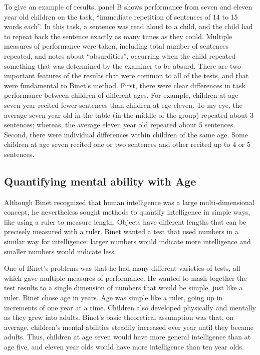 \documentclass[
  oneside,
  12pt]{crumpbook}
\begin{document}
To give an example of results, panel B shows performance from seven and eleven year old children on the task, ``immediate repetition of sentences of 14 to 15 words each''. In this task, a sentence was read aloud to a child, and the child had to repeat back the sentence exactly as many times as they could. Multiple measures of performance were taken, including total number of sentences repeated, and notes about ``absurdities'', occurring when the child repeated something that was determined by the examiner to be absurd. There are two important features of the results that were common to all of the tests, and that were fundamental to Binet's method. First, there were clear differences in task performance between children of different ages. For example, children at age seven year recited fewer sentences than children at ege eleven. To my eye, the average seven year old in the table (in the middle of the group) repeated about 3 sentences; whereas, the average eleven year old repeated about 5 sentences. Second, there were individual differences within children of the same age. Some children at age seven recited one or two sentences and other recited up to 4 or 5 sentences.

\hypertarget{quantifying-mental-ability-with-age}{%
\subsection{Quantifying mental ability with Age}\label{quantifying-mental-ability-with-age}}

Although Binet recognized that human intelligence was a large multi-dimensional concept, he nevertheless sought methods to quantify intelligence in simple ways, like using a ruler to measure length. Objects have different lengths that can be precisely measured with a ruler. Binet wanted a test that used numbers in a similar way for intelligence: larger numbers would indicate more intelligence and smaller numbers would indicate less.

One of Binet's problems was that he had many different varieties of tests, all which gave multiple measures of performance. He wanted to mash together the test results to a single dimension of numbers that would be simple, just like a ruler. Binet chose age in years. Age was simple like a ruler, going up in increments of one year at a time. Children also developed physically and mentally as they grew into adults. Binet's basic theoretical assumption was that, on average, children's mental abilities steadily increased ever year until they became adults. Thus, children at age seven would have more general intelligence than at age five, and eleven year olds would have more intelligence than ten year olds.
\end{document}
